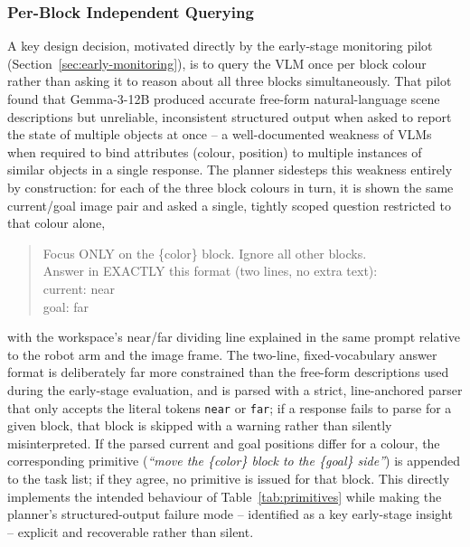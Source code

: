 \documentclass[12pt]{article}
\begin{document}
\subsubsection{Per-Block Independent Querying}
A key design decision, motivated directly by the early-stage monitoring pilot (Section~\ref{sec:early-monitoring}), is to query the VLM once per block colour rather than asking it to reason about all three blocks simultaneously. That pilot found that Gemma-3-12B produced accurate free-form natural-language scene descriptions but unreliable, inconsistent structured output when asked to report the state of multiple objects at once -- a well-documented weakness of VLMs when required to bind attributes (colour, position) to multiple instances of similar objects in a single response. The planner sidesteps this weakness entirely by construction: for each of the three block colours in turn, it is shown the same current/goal image pair and asked a single, tightly scoped question restricted to that colour alone,
\begin{quote}
\small\ttfamily
Focus ONLY on the \{color\} block. Ignore all other blocks. \\
Answer in EXACTLY this format (two lines, no extra text): \\
current: near \\
goal: far
\end{quote}
with the workspace's near/far dividing line explained in the same prompt relative to the robot arm and the image frame. The two-line, fixed-vocabulary answer format is deliberately far more constrained than the free-form descriptions used during the early-stage evaluation, and is parsed with a strict, line-anchored parser that only accepts the literal tokens \texttt{near} or \texttt{far}; if a response fails to parse for a given block, that block is skipped with a warning rather than silently misinterpreted. If the parsed current and goal positions differ for a colour, the corresponding primitive (\emph{``move the \{color\} block to the \{goal\} side''}) is appended to the task list; if they agree, no primitive is issued for that block. This directly implements the intended behaviour of Table~\ref{tab:primitives} while making the planner's structured-output failure mode -- identified as a key early-stage insight -- explicit and recoverable rather than silent.
\end{document}

